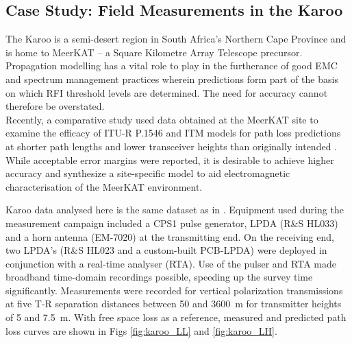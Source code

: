 \documentclass[10pt,journal,twoside]{IEEEtran}
\begin{document}
\subsection{Case Study: Field Measurements in the Karoo}
The Karoo is a semi-desert region in South Africa's Northern Cape Province and is home to MeerKAT -- a Square Kilometre Array Telescope precursor. Propagation modelling has a vital role to play in the furtherance of good EMC and spectrum management practices wherein predictions form part of the basis on which RFI threshold levels are determined. The need for accuracy cannot therefore be overstated.\\
Recently, a comparative study used data obtained at the MeerKAT site to examine the efficacy of ITU-R P.\num{1546} and ITM models for path loss predictions at shorter path lengths and lower transceiver heights than originally intended \cite{Phiri}. While acceptable error margins were reported, it is desirable to achieve higher accuracy and synthesize a site-specific model to aid electromagnetic characterisation of the MeerKAT environment.

Karoo data analysed here is the same dataset as in \cite{Phiri}. Equipment used during the measurement campaign included a CPS1 pulse generator, LPDA (R\&S HL033) and a horn antenna (EM-7020) at the transmitting end. On the receiving end, two LPDA's (R\&S HL023 and a custom-built PCB-LPDA) were deployed in conjunction with a real-time analyser (RTA). Use of the pulser and RTA made broadband time-domain recordings possible, speeding up the survey time significantly. Measurements were recorded for vertical polarization transmissions at five T-R separation distances between \SI{50}{} and \SI{3600}{m} for transmitter heights of \SI{5}{} and \SI{7.5}{m}. With free space loss as a reference, measured and predicted path loss curves are shown in Figs \ref{fig:karoo_LL} and \ref{fig:karoo_LH}. %
%
\end{document}
